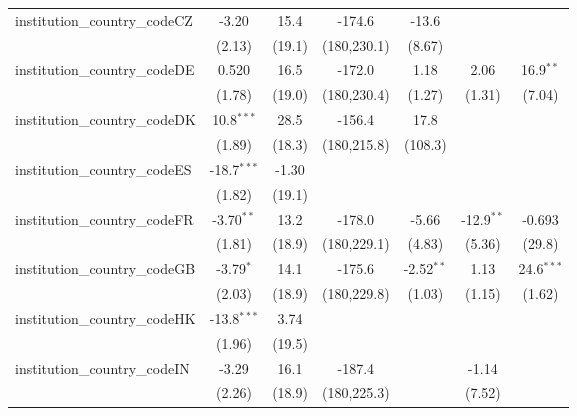 \begin{tabular}{lcccccc}
   institution\_country\_codeCZ          & -3.20         & 15.4         & -174.6        & -13.6         &               &   \\   
                                         & (2.13)        & (19.1)       & (180,230.1)   & (8.67)        &               &   \\   
   institution\_country\_codeDE          & 0.520         & 16.5         & -172.0        & 1.18          & 2.06          & 16.9$^{**}$\\   
                                         & (1.78)        & (19.0)       & (180,230.4)   & (1.27)        & (1.31)        & (7.04)\\   
   institution\_country\_codeDK          & 10.8$^{***}$  & 28.5         & -156.4        & 17.8          &               &   \\   
                                         & (1.89)        & (18.3)       & (180,215.8)   & (108.3)       &               &   \\   
   institution\_country\_codeES          & -18.7$^{***}$ & -1.30        &               &               &               &   \\   
                                         & (1.82)        & (19.1)       &               &               &               &   \\   
   institution\_country\_codeFR          & -3.70$^{**}$  & 13.2         & -178.0        & -5.66         & -12.9$^{**}$  & -0.693\\   
                                         & (1.81)        & (18.9)       & (180,229.1)   & (4.83)        & (5.36)        & (29.8)\\   
   institution\_country\_codeGB          & -3.79$^{*}$   & 14.1         & -175.6        & -2.52$^{**}$  & 1.13          & 24.6$^{***}$\\   
                                         & (2.03)        & (18.9)       & (180,229.8)   & (1.03)        & (1.15)        & (1.62)\\   
   institution\_country\_codeHK          & -13.8$^{***}$ & 3.74         &               &               &               &   \\   
                                         & (1.96)        & (19.5)       &               &               &               &   \\   
   institution\_country\_codeIN          & -3.29         & 16.1         & -187.4        &               & -1.14         &   \\   
                                         & (2.26)        & (18.9)       & (180,225.3)   &               & (7.52)        &   \\   

\end{tabular}
